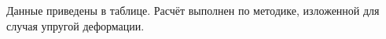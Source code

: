 Данные приведены в таблице. %
Расчёт выполнен по методике, изложенной для случая упругой деформации. %
